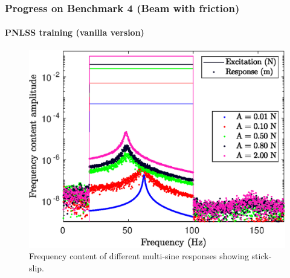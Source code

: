 \documentclass[aspectratio=169]{beamer}
\begin{document}
\begin{frame}[allowframebreaks]
  \frametitle{Progress on Benchmark 4 (Beam with friction)}
  \framesubtitle{PNLSS training (vanilla version)}
  \vspace{-0.5cm}
  \begin{figure}[!h]
    \centering
    \includegraphics[width=0.5\linewidth]{../../benchmark4/extabs_fig/b4_tdata_freqcont}
    \caption{Frequency content of different multi-sine
      responses showing stick-slip.}
  \end{figure}
  

\end{frame}
\end{document}
